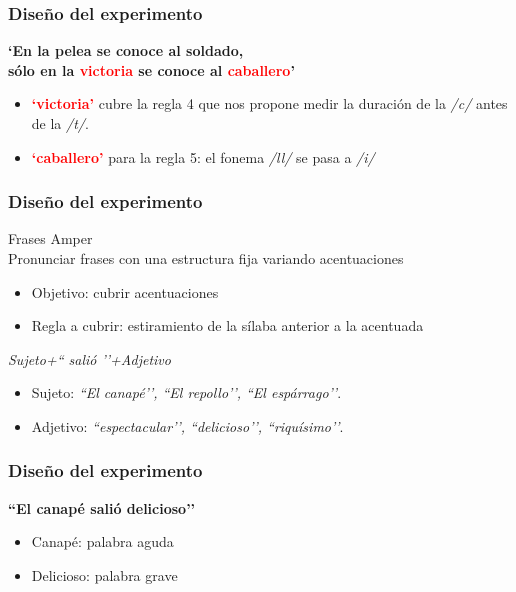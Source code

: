 \documentclass[mathserif, blue]{beamer}%
\begin{document}
\begin{frame}
	\frametitle{Diseño del experimento}
	\begin{center}
		\textbf{`En la pelea se conoce al soldado,} \\ 
		\textbf{sólo en la \textcolor{red}{victoria} se conoce al \textcolor{red}{caballero}’}
	\end{center}
	
	\begin{itemize}
		\item \textcolor{red}{\textbf{`victoria’}} cubre la regla 4 que nos propone medir la duración de la \textit{/c/} antes de la \textit{/t/}. 
		\item \textcolor{red}{\textbf{`caballero’}} para la regla 5: el fonema \textit{/ll/} se pasa a \textit{/i/} 
	\end{itemize}	
\end{frame} 

\begin{frame}
\frametitle{Diseño del experimento}
	{\Large Frases Amper} \\
	Pronunciar frases con una estructura fija variando acentuaciones
	
	\begin{itemize}
		\item Objetivo: cubrir acentuaciones
		\item Regla a cubrir: estiramiento de la sílaba anterior a la acentuada
	\end{itemize}
	
{\footnotesize 	
	\begin{center}
		\textit{Sujeto+`` salió ’’+Adjetivo} 
	
		\begin{itemize}
			\item Sujeto: \textit{``El canapé’’, ``El repollo’’, ``El espárrago’’}.
			\item Adjetivo: \textit{``espectacular’’, ``delicioso’’, ``riquísimo’’}.
		\end{itemize}
		
	\end{center}
}
\end{frame} 

\begin{frame}
	\frametitle{Diseño del experimento}

	\begin{center}
		\textbf{``El canapé salió delicioso’’}
	\end{center}
	
	\begin{itemize}
		\item Canapé: palabra aguda
		\item Delicioso: palabra grave
	\end{itemize}
\end{frame} 
\end{document}
